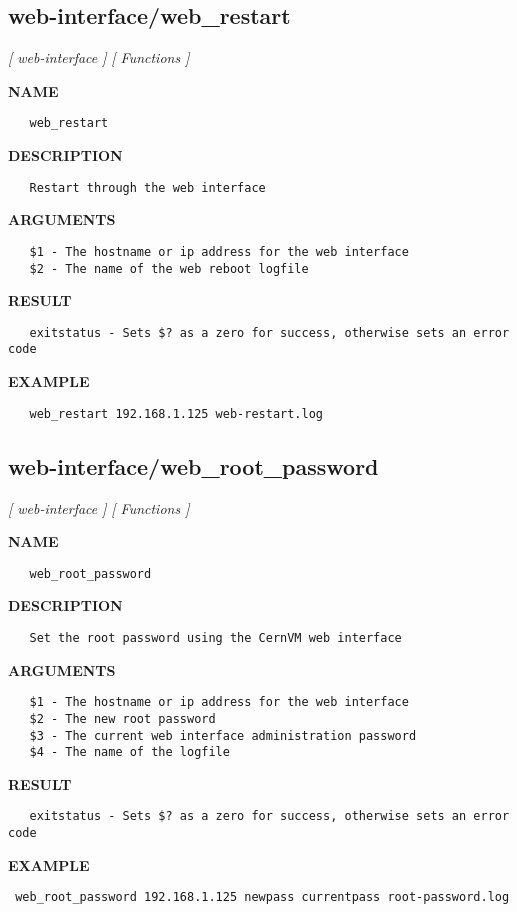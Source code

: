 \subsection{web-interface/web\_restart}
\textsl{[ web-interface ]}
\textsl{[ Functions ]}

\label{ch:robo77}
\label{ch:web_interface_web_restart}
\textbf{NAME}
\begin{verbatim}
   web_restart
\end{verbatim}
\textbf{DESCRIPTION}
\begin{verbatim}
   Restart through the web interface
\end{verbatim}
\textbf{ARGUMENTS}
\begin{verbatim}
   $1 - The hostname or ip address for the web interface
   $2 - The name of the web reboot logfile
\end{verbatim}
\textbf{RESULT}
\begin{verbatim}
   exitstatus - Sets $? as a zero for success, otherwise sets an error code
\end{verbatim}
\textbf{EXAMPLE}
\begin{verbatim}
   web_restart 192.168.1.125 web-restart.log
\end{verbatim}
\newpage
\subsection{web-interface/web\_root\_password}
\textsl{[ web-interface ]}
\textsl{[ Functions ]}

\label{ch:robo78}
\label{ch:web_interface_web_root_password}
\textbf{NAME}
\begin{verbatim}
   web_root_password
\end{verbatim}
\textbf{DESCRIPTION}
\begin{verbatim}
   Set the root password using the CernVM web interface
\end{verbatim}
\textbf{ARGUMENTS}
\begin{verbatim}
   $1 - The hostname or ip address for the web interface
   $2 - The new root password
   $3 - The current web interface administration password
   $4 - The name of the logfile
\end{verbatim}
\textbf{RESULT}
\begin{verbatim}
   exitstatus - Sets $? as a zero for success, otherwise sets an error code
\end{verbatim}
\textbf{EXAMPLE}
\begin{verbatim}
 web_root_password 192.168.1.125 newpass currentpass root-password.log
\end{verbatim}

